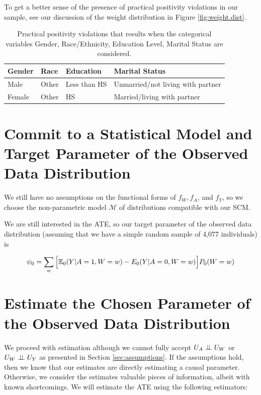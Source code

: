 \documentclass{article}
\begin{document}
To get a better sense of the presence of practical positivity violations in our sample, see our discussion of the weight distribution in Figure \ref{fig:weight.dist}.

\begin{center}
\begin{table}
\begin{tabular}{| l | l | l | l |}
\hline
 Gender & Race & Education & Marital Status \\
\hline
Male & Other & Less than HS & Unmarried/not living with partner \\
Female & Other & HS & Married/living with partner \\
\hline
\end{tabular}
\caption{Practical positivity violations that results when the categorical variables Gender, Race/Ethnicity, Education Level, Marital Status are considered.}
\label{tab:proc.pos}
\end{table}
\end{center}

\section{Commit to a Statistical Model and Target Parameter of the Observed Data Distribution}

We still have no assumptions on the functional forms of $f_W, f_A$, and $f_Y$, so we choose the non-parametric model $\mathcal{M}$ of distributions compatible with our SCM.  

We are still interested in the ATE, so our target parameter of the observed data distribution (assuming that we have a simple random sample of 4,077 individuals) is

$$\psi_0 = \sum_{w}\Big[\mathbb{E}_0(Y|A=1,W=w)-E_0(Y|A=0,W=w)\Big]P_0(W=w)$$

\section{Estimate the Chosen Parameter of the Observed Data Distribution}
\label{sec:estimates}

We proceed with estimation although we cannot fully accept $U_A \perp\hspace{-5pt}\perp U_W$ or $U_W \perp\hspace{-5pt}\perp U_Y$ as presented in Section \ref{sec:assumptions}. If the assumptions hold, then we know that our estimates are directly estimating a causal parameter. Otherwise, we consider the estimates valuable pieces of information, albeit with known shortcomings. We will estimate the ATE using the following estimators: 
\end{document}
